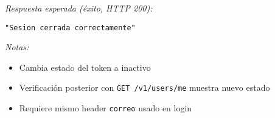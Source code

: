 \textit{Respuesta esperada (éxito, HTTP 200):}
\begin{lstlisting}
"Sesion cerrada correctamente"
\end{lstlisting}

\textit{Notas:}
\begin{itemize}
    \item Cambia estado del token a inactivo
    \item Verificación posterior con \texttt{GET /v1/users/me} muestra nuevo estado
    \item Requiere mismo header \texttt{correo} usado en login
\end{itemize}